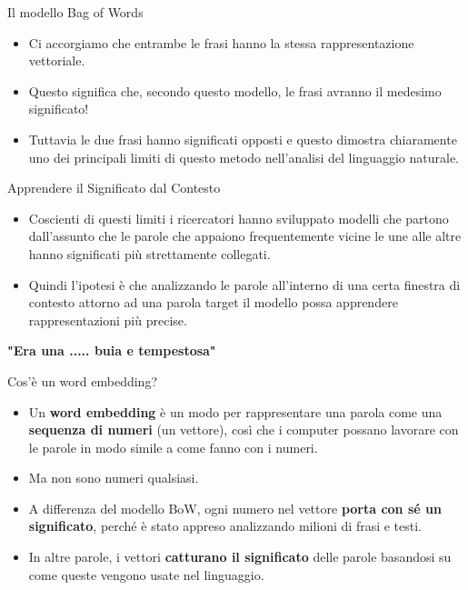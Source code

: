 \documentclass[aspectratio=169]{beamer}
\begin{document}
%
%
\begin{frame}{Il modello Bag of Words}
\begin{itemize}
\item Ci accorgiamo che entrambe le frasi hanno la stessa rappresentazione vettoriale. 
\item Questo significa che, secondo questo modello, le frasi avranno il medesimo significato! 
\item Tuttavia le due frasi hanno significati opposti e questo dimostra chiaramente uno dei principali limiti di questo metodo nell'analisi del linguaggio naturale.
\end{itemize}
\end{frame}
%
%
\begin{frame}{Apprendere il Significato dal Contesto}
\begin{itemize}
\item Coscienti di questi limiti i ricercatori hanno sviluppato modelli che partono dall'assunto che le parole che appaiono frequentemente vicine le une alle altre hanno significati più strettamente collegati. 
\item Quindi l'ipotesi è che analizzando le parole all'interno di una certa finestra di contesto attorno ad una parola target il modello possa apprendere rappresentazioni più precise.
\end{itemize}
\vspace{0.5cm}
\centering
\textbf{"Era una ..... buia e tempestosa"}
\end{frame}
%
%
\begin{frame}{Cos'è un word embedding?}
\begin{itemize}
\item Un \textbf{word embedding} è un modo per rappresentare una parola come una \textbf{sequenza di numeri} (un vettore), così che i computer possano lavorare con le parole in modo simile a come fanno con i numeri.
\item Ma non sono numeri qualsiasi. 
\item A differenza del modello BoW, ogni numero nel vettore \textbf{porta con sé un significato}, perché è stato appreso analizzando milioni di frasi e testi. 
\item In altre parole, i vettori \textbf{catturano il significato} delle parole basandosi su come queste vengono usate nel linguaggio.
\end{itemize}
\end{frame}
\end{document}

